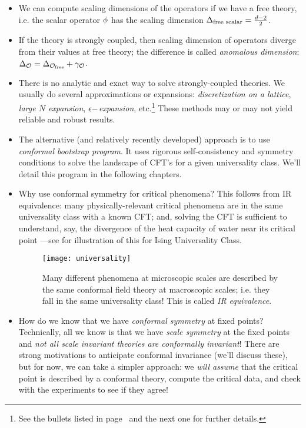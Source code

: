 \begin{itemize}
	\item We can compute scaling dimensions of the operators if we have a free theory, i.e. the  scalar operator $\phi$ has the scaling dimension $\Delta_{\text{free scalar}}=\frac{d-2}{2}$.
	
	\item If the theory is strongly coupled, then scaling dimension of operators diverge from their values at free theory; the difference is called \emph{anomalous dimension}: $\Delta_{\mathcal{O}}=\Delta_{\mathcal{O}_{\text{free}}}+\gamma_{\mathcal{O}}$.
	
	\item There is no analytic and exact way to solve strongly-coupled theories. We usually do several approximations or expansions: \emph{discretization on a lattice}, \emph{large $N$ expansion}, \emph{$\epsilon-$expansion}, etc.\footnote{See the bullets listed in page~\pageref{items: problems with strongly coupled systems} and the next one for further details. }  These methods may or may not yield reliable and robust results.
	
	\item The alternative (and relatively recently developed) approach is to use \emph{conformal bootstrap program}. It uses rigorous self-consistency and symmetry conditions to solve the landscape of CFT's for a given universality class. We'll detail this program in the following chapters.
	
	\item Why use conformal symmetry for critical phenomena? This follows from IR equivalence: many physically-relevant critical phenomena are in the same universality class with a known CFT; and, solving the CFT is sufficient to understand, say, the divergence of the heat capacity of water near its critical point  ---see \figref{\ref{fig: ir equivalence}} for illustration of this for Ising Universality Class.
	
	\begin{figure}
		\centering 
		\texttt{[image: universality]}
		\caption[IR equivalence]{\label{fig: ir equivalence}Many different phenomena at microscopic scales are described by the same conformal field theory at macroscopic scales; i.e. they fall in the same universality class! This is called \emph{IR equivalence}.}
	\end{figure}
	\item How do we know that we have \emph{conformal symmetry} at fixed points? Technically, all we know is that we have \emph{scale symmetry} at the fixed points and \emph{not all scale invariant theories are conformally invariant}! There are strong motivations to anticipate conformal invariance (we'll discuss these), but for now, we can take a simpler approach: we \emph{will assume} that the critical point is described by a conformal theory, compute the critical data, and check with the experiments to see if they agree!
	
\end{itemize}

